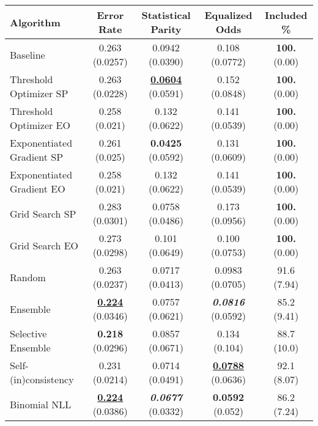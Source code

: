 \begin{tabular} {|l|c|c|c|c|}
\hline
\textbf{Algorithm} & \textbf{Error Rate} & \textbf{Statistical Parity} & \textbf{Equalized Odds} & \textbf{Included \%} \\ \hline
Baseline & 0.263 (0.0257) & 0.0942 (0.0390) & 0.108 (0.0772) & \textbf{100.} (0.00) \\ \hline 
Threshold Optimizer SP & 0.263 (0.0228) & \textbf{\underline{0.0604}} (0.0591) & 0.152 (0.0848) & \textbf{100.} (0.00) \\ \hline 
Threshold Optimizer EO & 0.258 (0.021) & 0.132 (0.0622) & 0.141 (0.0539) & \textbf{100.} (0.00) \\ \hline 
Exponentiated Gradient SP & 0.261 (0.025) & \textbf{0.0425} (0.0592) & 0.131 (0.0609) & \textbf{100.} (0.00) \\ \hline 
Exponentiated Gradient EO & 0.258 (0.021) & 0.132 (0.0622) & 0.141 (0.0539) & \textbf{100.} (0.00) \\ \hline 
Grid Search SP & 0.283 (0.0301) & 0.0758 (0.0486) & 0.173 (0.0956) & \textbf{100.} (0.00) \\ \hline 
Grid Search EO & 0.273 (0.0298) & 0.101 (0.0649) & 0.100 (0.0753) & \textbf{100.} (0.00) \\ \hline 
Random & 0.263 (0.0237) & 0.0717 (0.0413) & 0.0983 (0.0705) & 91.6 (7.94) \\ \hline 
Ensemble & \textbf{\underline{0.224}} (0.0346) & 0.0757 (0.0621) & \textbf{\textit{0.0816}} (0.0592) & 85.2 (9.41) \\ \hline 
Selective Ensemble & \textbf{0.218} (0.0296) & 0.0857 (0.0671) & 0.134 (0.104) & 88.7 (10.0) \\ \hline 
Self-(in)consistency & 0.231 (0.0214) & 0.0714 (0.0491) & \textbf{\underline{0.0788}} (0.0636) & 92.1 (8.07) \\ \hline 
Binomial NLL & \textbf{\underline{0.224}} (0.0386) & \textbf{\textit{0.0677}} (0.0332) & \textbf{0.0592} (0.052) & 86.2 (7.24) \\ \hline 
\end{tabular}